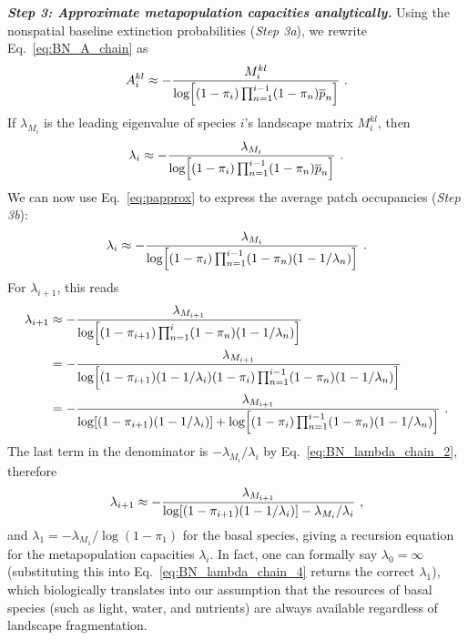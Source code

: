 \documentclass[11pt]{article}
\newcommand{\ol}[1]{\overline{#1}}
\let\originalleft\left
\let\originalright\right
\renewcommand{\left}{\mathopen{}\mathclose\bgroup\originalleft}
\renewcommand{\right}{\aftergroup\egroup\originalright}
\begin{document}
\textit{\textbf{Step 3: Approximate metapopulation capacities analytically.}}
Using the nonspatial baseline extinction probabilities (\textit{Step 3a}), we rewrite Eq.~\ref{eq:BN_A_chain} as
\begin{equation}
  \label{eq:BN_A_chain_2}
  A_i^{kl} \approx -\frac{M_i^{kl}}{\log\left[ (1 - \pi_i) \prod_{n=1}^{i-1}
      (1 - \pi_n) \ol{p}_n \right]} \ .
\end{equation}
If $\lambda_{M_i}$ is the leading eigenvalue of species $i$'s landscape matrix $M_i^{kl}$, then
\begin{equation}
  \label{eq:BN_lambda_chain}
  \lambda_i \approx -\frac{\lambda_{M_i}}{\log\left[ (1 - \pi_i) \prod_{n=1}^{i-1}
      (1 - \pi_n) \ol{p}_n \right]} \ .
\end{equation}
We can now use Eq.~\ref{eq:papprox} to express the average patch occupancies (\textit{Step 3b}):
\begin{equation}
  \label{eq:BN_lambda_chain_2}
  \lambda_i \approx -\frac{\lambda_{M_i}}{\log\left[ (1 - \pi_i) \prod_{n=1}^{i-1}
      (1 - \pi_n) \left( 1 - 1/\lambda_n \right) \right]} \ .
\end{equation}
For $\lambda_{i+1}$, this reads
\begin{equation}
  \label{eq:BN_lambda_chain_3}
  \begin{split}
    \lambda_{i+1} &\approx - \frac{\lambda_{M_{i+1}}}{\log\left[ (1 - \pi_{i+1})
        \prod_{n=1}^{i} (1 - \pi_n) \left( 1 - 1/\lambda_n \right) \right]}
    \\ &= - \frac{\lambda_{M_{i+1}}}{\log \left[ (1 - \pi_{i+1}) (1-1/\lambda_i)
        (1 - \pi_i) \prod_{n=1}^{i-1} (1 - \pi_n) \left( 1-1/\lambda_n
        \right) \right]}
    \\ &= - \frac{\lambda_{M_{i+1}}}{\log \left[ (1 - \pi_{i+1}) (1-1/\lambda_i)
      \right] + \log \left[(1 - \pi_i) \prod_{n=1}^{i-1} (1 - \pi_n)
          \left( 1-1/\lambda_n \right) \right]} \ .
  \end{split}
\end{equation}
The last term in the denominator is $-\lambda_{M_i}/\lambda_i$ by Eq.~\ref{eq:BN_lambda_chain_2}, therefore
\begin{equation}
  \label{eq:BN_lambda_chain_4}
  \lambda_{i+1} \approx - \frac{\lambda_{M_{i+1}}}{\log \left[ (1 - \pi_{i+1})
      (1-1/\lambda_i) \right] - \lambda_{M_i} / \lambda_i} \ ,
\end{equation}
and $\lambda_1 = -\lambda_{M_1} / \log(1-\pi_1)$ for the basal species, giving a recursion equation for the metapopulation capacities $\lambda_i$. In fact, one can formally say $\lambda_0 = \infty$ (substituting this into Eq.~\ref{eq:BN_lambda_chain_4} returns the correct $\lambda_1$), which biologically translates into our assumption that the resources of basal species (such as light, water, and nutrients) are always available regardless of landscape fragmentation.
\end{document}
